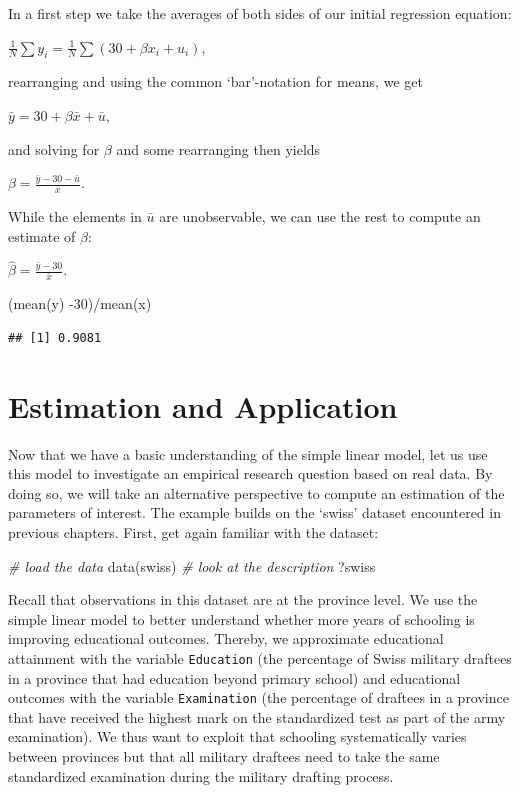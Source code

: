 \documentclass[
  12pt,
]{style/krantz}
\newenvironment{Shaded}{\begin{snugshade}}{\end{snugshade}}
\newcommand{\CommentTok}[1]{\textcolor[rgb]{0.56,0.35,0.01}{\textit{#1}}}
\newcommand{\DecValTok}[1]{\textcolor[rgb]{0.00,0.00,0.81}{#1}}
\newcommand{\FunctionTok}[1]{\textcolor[rgb]{0.00,0.00,0.00}{#1}}
\newcommand{\NormalTok}[1]{#1}
\newcommand{\SpecialCharTok}[1]{\textcolor[rgb]{0.00,0.00,0.00}{#1}}
\begin{document}
In a first step we take the averages of both sides of our initial regression equation:

\(\frac{1}{N}\sum{y_i}=\frac{1}{N}\sum{(30 + \beta x_{i} + u_{i})}\),

rearranging and using the common `bar'-notation for means, we get

\(\bar{y}=30+\beta\bar{x} + \bar{u}\),

and solving for \(\beta\) and some rearranging then yields

\(\beta=\frac{\bar{y}-30-\bar{u}}{\bar{x}}\).

While the elements in \(\bar{u}\) are unobservable, we can use the rest to compute an estimate of \(\beta\):

\(\hat{\beta}=\frac{\bar{y}-30}{\bar{x}}\).

\begin{Shaded}
\begin{Highlighting}[]
\NormalTok{(}\FunctionTok{mean}\NormalTok{(y) }\SpecialCharTok{{-}}\DecValTok{30}\NormalTok{)}\SpecialCharTok{/}\FunctionTok{mean}\NormalTok{(x)}
\end{Highlighting}
\end{Shaded}

\begin{verbatim}
## [1] 0.9081
\end{verbatim}

\hypertarget{estimation-and-application}{%
\section{Estimation and Application}\label{estimation-and-application}}

Now that we have a basic understanding of the simple linear model, let us use this model to investigate an empirical research question based on real data. By doing so, we will take an alternative perspective to compute an estimation of the parameters of interest. The example builds on the `swiss' dataset encountered in previous chapters. First, get again familiar with the dataset:

\begin{Shaded}
\begin{Highlighting}[]
\CommentTok{\# load the data}
\FunctionTok{data}\NormalTok{(swiss)}
\CommentTok{\# look at the description}
\NormalTok{?swiss}
\end{Highlighting}
\end{Shaded}

Recall that observations in this dataset are at the province level. We use the simple linear model to better understand whether more years of schooling is improving educational outcomes. Thereby, we approximate educational attainment with the variable \texttt{Education} (the percentage of Swiss military draftees in a province that had education beyond primary school) and educational outcomes with the variable \texttt{Examination} (the percentage of draftees in a province that have received the highest mark on the standardized test as part of the army examination). We thus want to exploit that schooling systematically varies between provinces but that all military draftees need to take the same standardized examination during the military drafting process.
\end{document}
